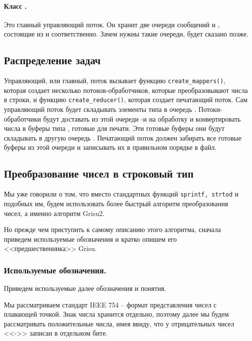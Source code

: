 \paragraph{Класс \texttt{}.}
Это главный управляющий поток.
Он хранит две очереди сообщений \texttt{} и \texttt{}, состоящие из \texttt{} и \texttt{} соответственно. 
Зачем нужны такие очереди, будет сказано позже.

\subsection{Распределение задач}
Управляющий, или главный, поток \texttt{} вызывает функцию \texttt{create\_mappers()}, которая создает несколько потоков-обработчиков, которые преобразовывают числа в строки, и функцию \texttt{create\_reducer()}, которая создает печатающий поток.
Сам управляющий поток будет складывать элементы типа \texttt{} в очередь \texttt{}.
Потоки-обработчики будут доставать из этой очереди \texttt{}-и на обработку и конвертировать числа в буферы типа \texttt{}, готовые для печати.
Эти готовые буферы они будут складывать в другую очередь \texttt{}.
Печатающий поток должен забирать все готовые буферы из этой очереди и записывать их в правильном порядке в файл.


\subsection{Преобразование чисел в строковый тип}
Мы уже говорили о том, что вместо стандартных функций \texttt{sprintf, strtod} и подобных им, будем использовать более быстрый алгоритм преобразования чисел, а именно алгоритм \textsf{Grisu2}.

Но прежде чем приступить к самому описанию этого алгоритма, сначала приведем используемые обозначения и кратко опишем его <<предшественника>> \textsf{Grisu}.  

\subsubsection{Используемые обозначения.}
Приведем используемые далее обозначения и понятия.

Мы рассматриваем стандарт \textsf{IEEE 754} -- формат представления чисел с плавающей точкой.
Знак числа хранится отдельно, поэтому далее мы будем рассматривать положительные числа, имея ввиду, что у отрицательных чисел <<->> записан в отдельном бите.


